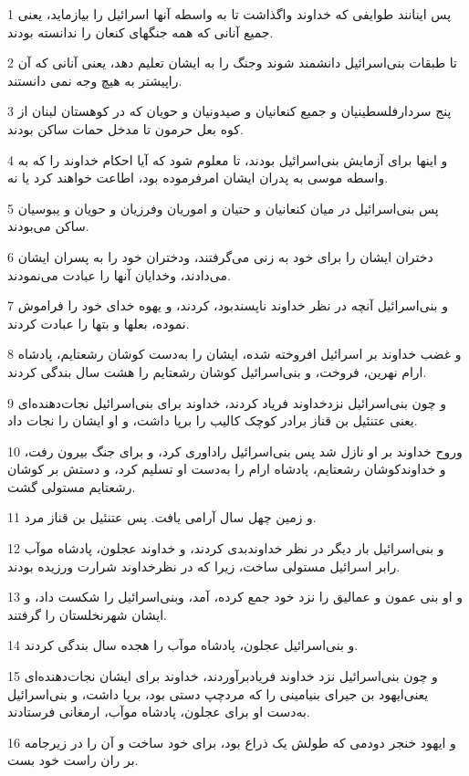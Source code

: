 \par 1 پس اینانند طوایفی که خداوند واگذاشت تا به واسطه آنها اسرائیل را بیازماید، یعنی جمیع آنانی که همه جنگهای کنعان را ندانسته بودند.
\par 2 تا طبقات بنی‌اسرائیل دانشمند شوند وجنگ را به ایشان تعلیم دهد، یعنی آنانی که آن راپیشتر به هیچ وجه نمی دانستند.
\par 3 پنج سردارفلسطینیان و جمیع کنعانیان و صیدونیان و حویان که در کوهستان لبنان از کوه بعل حرمون تا مدخل حمات ساکن بودند.
\par 4 و اینها برای آزمایش بنی‌اسرائیل بودند، تا معلوم شود که آیا احکام خداوند را که به واسطه موسی به پدران ایشان امرفرموده بود، اطاعت خواهند کرد یا نه.
\par 5 پس بنی‌اسرائیل در میان کنعانیان و حتیان و اموریان وفرزیان و حویان و یبوسیان ساکن می‌بودند.
\par 6 دختران ایشان را برای خود به زنی می‌گرفتند، ودختران خود را به پسران ایشان می‌دادند، وخدایان آنها را عبادت می‌نمودند.
\par 7 و بنی‌اسرائیل آنچه در نظر خداوند ناپسندبود، کردند، و یهوه خدای خود را فراموش نموده، بعلها و بتها را عبادت کردند.
\par 8 و غضب خداوند بر اسرائیل افروخته شده، ایشان را به‌دست کوشان رشعتایم، پادشاه ارام نهرین، فروخت، و بنی‌اسرائیل کوشان رشعتایم را هشت سال بندگی کردند.
\par 9 و چون بنی‌اسرائیل نزدخداوند فریاد کردند، خداوند برای بنی‌اسرائیل نجات‌دهنده‌ای یعنی عتنئیل بن قناز برادر کوچک کالیب را برپا داشت، و او ایشان را نجات داد.
\par 10 وروح خداوند بر او نازل شد پس بنی‌اسرائیل راداوری کرد، و برای جنگ بیرون رفت، و خداوندکوشان رشعتایم، پادشاه ارام را به‌دست او تسلیم کرد، و دستش بر کوشان رشعتایم مستولی گشت.
\par 11 و زمین چهل سال آرامی یافت. پس عتنئیل بن قناز مرد.
\par 12 و بنی‌اسرائیل بار دیگر در نظر خداوندبدی کردند، و خداوند عجلون، پادشاه موآب رابر اسرائیل مستولی ساخت، زیرا که در نظرخداوند شرارت ورزیده بودند.
\par 13 و او بنی عمون و عمالیق را نزد خود جمع کرده، آمد، وبنی‌اسرائیل را شکست داد، و ایشان شهرنخلستان را گرفتند.
\par 14 و بنی‌اسرائیل عجلون، پادشاه موآب را هجده سال بندگی کردند.
\par 15 و چون بنی‌اسرائیل نزد خداوند فریادبرآوردند، خداوند برای ایشان نجات‌دهنده‌ای یعنی‌ایهود بن جیرای بنیامینی را که مردچپ دستی بود، برپا داشت، و بنی‌اسرائیل به‌دست او برای عجلون، پادشاه موآب، ارمغانی فرستادند.
\par 16 و ایهود خنجر دودمی که طولش یک ذراع بود، برای خود ساخت و آن را در زیرجامه بر ران راست خود بست.
